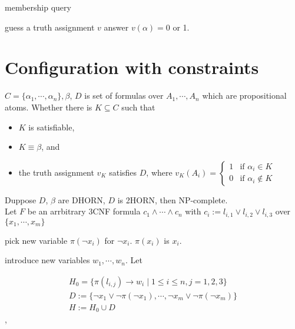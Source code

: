 \documentclass[12pt]{article}
\begin{document}
{membership query

guess a truth assignment $v$ answer $v(\alpha)=0$ or 1. \\






 


\section{Configuration with constraints}

$C=\{\alpha_1,\cdots, \alpha_n\}, \beta$,
$D$ is set of formulas over $A_1,\cdots, A_n$ which are propositional atoms.
Whether there is $K\subseteq C$ such that 
\begin{itemize}
\item $K$ is satisfiable,
\item $K\equiv\beta$, and
\item the truth assignment $v_K$ satisfies $D$, where $v_K(A_i)=\left\{\begin{array}{ll}
1 & \text{if } \alpha_i\in K\\ 0 & \text{if }\alpha_i\not\in K\end{array}\right.$  

\end{itemize}

Duppose $D$, $\beta$ are DHORN, $D$ is 2HORN, then NP-complete.\\




Let $F$ be an arrbitrary 3CNF formula $c_1\wedge \cdots\wedge c_n$ with $c_i:=l_{i,1}\vee l_{i,2}\vee l_{i,3}$  over $\{x_1,\cdots, x_m\}$


pick new variable $\pi(\neg x_i)$ for $\neg x_i$. $\pi(x_i)$ is $x_i$. 

introduce new variables $w_1, \cdots, w_n$. Let

$$\begin{array}{l}H_0=\{\pi(l_{i,j})\rightarrow w_i\mid 1\leq i\leq n, j=1,2,3\}\\
D:=\{\neg x_1\vee \neg \pi(\neg x_1), \cdots, \neg x_m\vee \neg \pi(\neg x_m)\}\\
H:=H_0\cup D\end{array}$$, 

}
\end{document}
